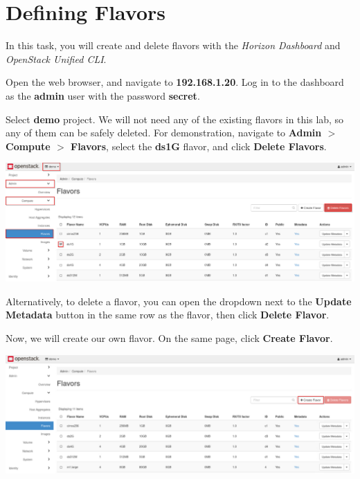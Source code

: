 \documentclass[letterpaper, 12pt]{article}
\begin{document}
\section{Defining Flavors}\label{sec:defining-flavors}
In this task, you will create and delete flavors with the \textit{Horizon Dashboard} and \textit{OpenStack Unified CLI}.

\begin{enumerate}
    \begin{labstep}
        Open the web browser, and navigate to \textbf{192.168.1.20}.
        Log in to the dashboard as the \textbf{admin} user with the password \textbf{secret}.
    \end{labstep}

    \begin{labstep}
        Select \textbf{demo} project.
        We will not need any of the existing flavors in this lab, so any of them can be safely deleted.
        For demonstration, navigate to \textbf{Admin $>$ Compute $>$ Flavors}, select the \textbf{ds1G} flavor, and click \textbf{Delete Flavors}.

        \begin{center}
            \includegraphics[width=\linewidth]{images/part2/step2.png}
        \end{center}
    \end{labstep}

    \begin{tipbox}
        Alternatively, to delete a flavor, you can open the dropdown next to the \textbf{Update Metadata} button in the same row as the flavor, then click \textbf{Delete Flavor}.
    \end{tipbox}

    \begin{labstep}
        Now, we will create our own flavor.
        On the same page, click \textbf{Create Flavor}.

        \begin{center}
            \includegraphics[width=\linewidth]{images/part2/step3.png}
        \end{center}
    \end{labstep}


\end{enumerate}
\end{document}
